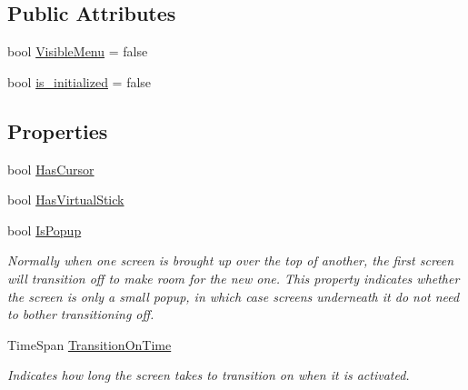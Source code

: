 \subsection*{Public Attributes}
\begin{DoxyCompactItemize}
\item 
bool \hyperlink{classgearit_1_1xna_1_1_game_screen_ab44dcd600c5f92f0de16bd20b2aba32f}{Visible\+Menu} = false
\item 
bool \hyperlink{classgearit_1_1xna_1_1_game_screen_a9650c912126ccbc4dfbe86f2b460cbad}{is\+\_\+initialized} = false
\end{DoxyCompactItemize}
\subsection*{Properties}
\begin{DoxyCompactItemize}
\item 
bool \hyperlink{classgearit_1_1xna_1_1_game_screen_aced91217f1d3f0d720acf8e90b91fdbb}{Has\+Cursor}
\item 
bool \hyperlink{classgearit_1_1xna_1_1_game_screen_ad906b952f79403c4d9ee69cbfcba2a80}{Has\+Virtual\+Stick}
\item 
bool \hyperlink{classgearit_1_1xna_1_1_game_screen_aed379623ce9eda3c3e28daf2ff75cb3e}{Is\+Popup}
\begin{DoxyCompactList}\small\item\em Normally when one screen is brought up over the top of another, the first screen will transition off to make room for the new one. This property indicates whether the screen is only a small popup, in which case screens underneath it do not need to bother transitioning off. \end{DoxyCompactList}\item 
Time\+Span \hyperlink{classgearit_1_1xna_1_1_game_screen_afb57a139ac73624a198bf8c4e7222024}{Transition\+On\+Time}
\begin{DoxyCompactList}\small\item\em Indicates how long the screen takes to transition on when it is activated. \end{DoxyCompactList}\item 

\end{DoxyCompactItemize}
